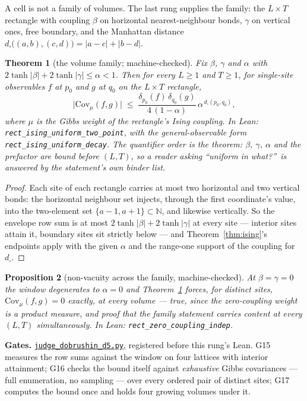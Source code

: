 \documentclass[11pt]{article}
\newtheorem{theorem}{Theorem}[section]
\newtheorem{proposition}[theorem]{Proposition}
\theoremstyle{definition}
\newcommand{\anchor}{c7b870b05bd6d1bec270d499e1358a64070ce0e1}
\newcommand{\repofile}[2]{%
  \href{https://github.com/lluiseriksson/THE-ERIKSSON-PROGRAMME/blob/\anchor/#1}{\nolinkurl{#2}}}
\newcommand{\N}{\mathbb{N}}
\begin{document}
A cell is not a family of volumes.  The last rung supplies the family: the
$L\times T$ rectangle with coupling $\beta$ on horizontal nearest-neighbour
bonds, $\gamma$ on vertical ones, free boundary, and the Manhattan distance
$d_{\square}\bigl((a,b),(c,d)\bigr)=|a-c|+|b-d|$.

\begin{theorem}[the volume family; machine-checked]
\label{thm:family}
Fix $\beta$, $\gamma$ and $\alpha$ with
$2\tanh|\beta|+2\tanh|\gamma|\le\alpha<1$.  Then for \emph{every} $L\ge1$ and
$T\ge1$, for single-site observables $f$ at $p_0$ and $g$ at $q_0$ on the
$L\times T$ rectangle,
\[
  \bigl|\mathrm{Cov}_{\mu}(f,g)\bigr|\;\le\;
  \frac{\delta_{p_0}(f)\,\delta_{q_0}(g)}{4\,(1-\alpha)}\,
  \alpha^{\,d_{\square}(p_0,q_0)} ,
\]
where $\mu$ is the Gibbs weight of the rectangle's Ising coupling.  In Lean:
\texttt{rect\_ising\_uniform\_two\_point}, with the general-observable form
\texttt{rect\_ising\_uniform\_decay}.  The quantifier order is the theorem:
$\beta$, $\gamma$, $\alpha$ and the prefactor are bound \emph{before}
$(L,T)$, so a reader asking ``uniform in what?''\ is answered by the
statement's own binder list.
\end{theorem}

\begin{proof}
Each site of each rectangle carries at most two horizontal and two vertical
bonds: the horizontal neighbour set injects, through the first coordinate's
value, into the two-element set $\{a-1,a+1\}\subset\N$, and likewise
vertically.  So the envelope row sum is at most $2\tanh|\beta|+2\tanh|\gamma|$
at every site --- interior sites attain it, boundary sites sit strictly
below --- and Theorem~\ref{thm:ising}'s endpoints apply with the given
$\alpha$ and the range-one support of the coupling for $d_{\square}$.
\end{proof}

\begin{proposition}[non-vacuity across the family, machine-checked]
\label{prop:family-witness}
At $\beta=\gamma=0$ the window degenerates to $\alpha=0$ and
Theorem~\ref{thm:family} forces, for distinct sites,
$\mathrm{Cov}_{\mu}(f,g)=0$ exactly, at every volume --- true, since the
zero-coupling weight is a product measure, and proof that the family
statement carries content at every $(L,T)$ simultaneously.  In Lean:
\texttt{rect\_zero\_coupling\_indep}.
\end{proposition}

\textbf{Gates.}
\repofile{scripts/judge\_dobrushin\_d5.py}{judge\_dobrushin\_d5.py},
registered before this rung's Lean.  G15 measures the row sums against the
window on four lattices with interior attainment; G16 checks the bound
itself against \emph{exhaustive} Gibbs covariances --- full enumeration, no
sampling --- over every ordered pair of distinct sites; G17 computes the
bound once and holds four growing volumes under it.
\end{document}
